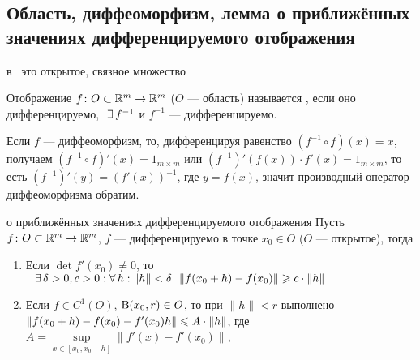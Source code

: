 \subsection{Область, диффеоморфизм, лемма о приближённых значениях дифференцируемого отображения}

\begin{opr}
	 в \rmm\ это открытое, связное множество
\end{opr}

\begin{opr}
	Отображение $f \colon O \subset \mathbb R^m \to \mathbb R^m$ ($O$ --- область) называется , если оно дифференцируемо,$\E f^{-1}$ и $f^{-1}$ --- дифференцируемо.
\end{opr}

\begin{zam}
	Если $f$ --- диффеоморфизм, то, дифференцируя равенство $(f^{-1} \circ f)(x) = x$, получаем $(f^{-1} \circ f)'(x) = 1_{m \times m}$ или $(f^{-1})'(f(x)) \cdot f'(x) = 1_{m \times m}$, то есть $(f^{-1})'(y) = (f'(x))^{-1}$, где $y = f(x)$, значит производный оператор диффеоморфизма обратим.
\end{zam}

\begin{lem}[https://www.youtube.com/live/Ebv-BznzM6k?si=RireGv1RXr_0TJBB&t=652]{о приближённых значениях дифференцируемого отображения}
	Пусть $f \colon O \subset \mathbb R^m \to \mathbb R^m$, $f$ --- дифференцируемо в точке $x_0 \in O$ ($O$ --- открытое), тогда 
	\begin{enumerate}
	\item Если $\det f'(x_0) \ne 0$, то$\hspace{7pt plus 1pt minus 2pt} \exists \, \delta > 0, c >0 : \forall \, h : \|h\| < \delta\ \ \|f(x_0 + h) - f(x_0)\| \geqslant c \cdot \|h\|$
	
	\item Если $f \in C^1(O)$, $\mathrm B(x_0, r) \in O$, то при $\|h\| < r$ выполнено $\|f(x_0 + h) - f(x_0) - f'(x_0)h\| \leqslant A \cdot \|h\|$, где $A = \sup\limits_{x \in [x_0, x_0 + h]} \|f'(x) - f'(x_0)\|$,  
	\end{enumerate} 
\end{lem}

